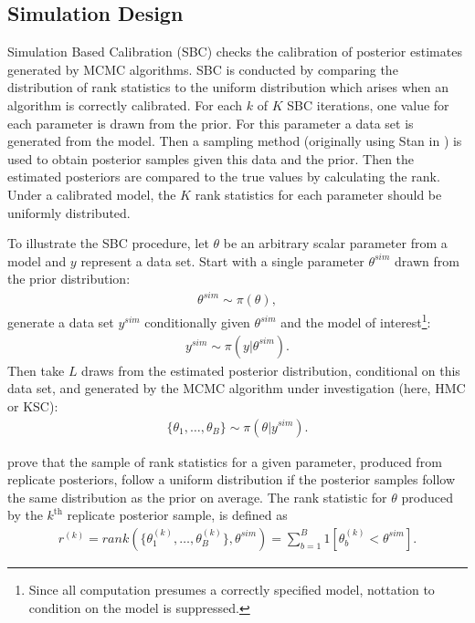 \documentclass[12pt, a4paper]{article}
\begin{document}
    \subsection{Simulation Design}
        Simulation Based Calibration (SBC) checks the calibration of posterior estimates generated by MCMC algorithms. SBC is conducted by comparing the distribution of rank statistics to the uniform distribution which arises when an algorithm is correctly calibrated. For each $k$ of $K$ SBC iterations, one value for each parameter is drawn from the prior. For this parameter a data set is generated from the model. Then a sampling method (originally using Stan in \citet{talts2018validating}) is used to obtain posterior samples given this data and the prior. Then the estimated posteriors are compared to the true values by calculating the rank. Under a calibrated model, the $K$ rank statistics for each parameter should be uniformly distributed. 

        To illustrate the SBC procedure, let $\theta$ be an arbitrary scalar parameter from a model and $y$ represent a data set. Start with a single parameter $\theta^{sim}$ drawn from the prior distribution:
        \begin{align}
        \theta^{sim} \sim \pi(\theta),
        \end{align}
        generate a data set $y^{sim}$ conditionally given $\theta^{sim}$ and the model of interest\footnote{Since all computation presumes a correctly specified model, nottation to condition on the model is suppressed.}:
        \begin{align}
        y^{sim} \sim \pi (y|\theta^{sim}).
        \end{align}
        Then take $L$ draws from the estimated posterior distribution, conditional on this data set, and generated by the MCMC algorithm under investigation (here, HMC or KSC):
        \begin{align}
        \{\theta_1,\dots , \theta_{B}\} \sim \pi (\theta | y^{sim}).
        \end{align}

        \citet{talts2018validating} prove that the sample of rank statistics for a given parameter, produced from replicate posteriors, follow a uniform distribution if the posterior samples follow the same distribution as the prior on average. The rank statistic for $\theta$ produced by the $k^{\mathrm{th}}$ replicate posterior sample, is defined as
        \begin{align}
        r^{(k)} = rank(\{\theta_1^{(k)},\dots , \theta_{B}^{(k)}\}, \theta^{sim}) = \sum_{b=1}^{B}1[\theta_{b}^{(k)} < \theta^{sim}].
        \end{align}
\end{document}
